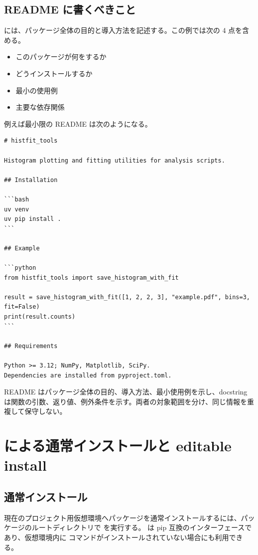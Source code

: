 \subsection{README に書くべきこと}

 には、パッケージ全体の目的と導入方法を記述する。この例では次の 4 点を含める。

\begin{itemize}
\item このパッケージが何をするか
\item どうインストールするか
\item 最小の使用例
\item 主要な依存関係
\end{itemize}

例えば最小限の README は次のようになる。

\begin{lstlisting}[numbers=none, xleftmargin=2\zw, title={README.md}]
# histfit_tools

Histogram plotting and fitting utilities for analysis scripts.

## Installation

```bash
uv venv
uv pip install .
```

## Example

```python
from histfit_tools import save_histogram_with_fit

result = save_histogram_with_fit([1, 2, 2, 3], "example.pdf", bins=3, fit=False)
print(result.counts)
```

## Requirements

Python >= 3.12; NumPy, Matplotlib, SciPy.
Dependencies are installed from pyproject.toml.
\end{lstlisting}

README はパッケージ全体の目的、導入方法、最小使用例を示し、docstring は関数の引数、返り値、例外条件を示す。両者の対象範囲を分け、同じ情報を重複して保守しない。

\section{ による通常インストールと editable install}

\subsection{通常インストール}

現在のプロジェクト用仮想環境へパッケージを通常インストールするには、パッケージのルートディレクトリで  を実行する。 は pip 互換のインターフェースであり、仮想環境内に  コマンドがインストールされていない場合にも利用できる。

